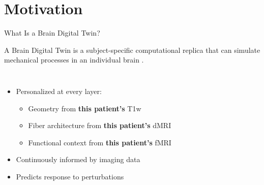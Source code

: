 
\section{Motivation}

\begin{frame}{What Is a Brain Digital Twin?}

  A \alert{Brain Digital Twin} is a subject-specific computational replica
  that can simulate mechanical processes in an individual brain
  \cite{Goriely2015,Meaney2014}.

  \bigskip

  \begin{columns}[T]
    \begin{itemize}
      \item Personalized at every layer:
      \begin{itemize}
        \item Geometry from \textbf{this patient's} T1w
        \item Fiber architecture from \textbf{this patient's} dMRI
        \item Functional context from \textbf{this patient's} fMRI
      \end{itemize}
      \item Continuously informed by imaging data
      \item Predicts response to perturbations
    \end{itemize}

    \begin{center}
    \end{center}
  \end{columns}

\end{frame}

